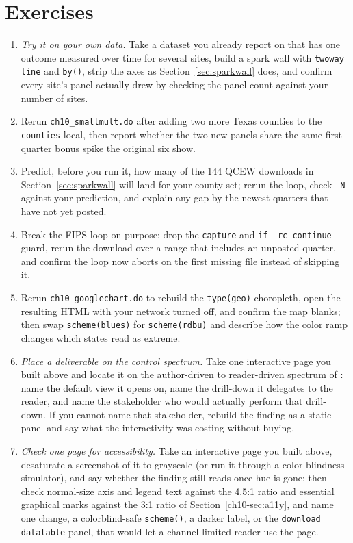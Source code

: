 \section*{Exercises}
\begin{enumerate}
\item \emph{Try it on your own data.} Take a dataset you already report on that has one outcome measured over time for several sites, build a spark wall with \texttt{twoway line} and \texttt{by()}, strip the axes as Section~\ref{sec:sparkwall} does, and confirm every site's panel actually drew by checking the panel count against your number of sites.
\item Rerun \texttt{ch10\_smallmult.do} after adding two more Texas counties to the \texttt{counties} local, then report whether the two new panels share the same first-quarter bonus spike the original six show.
\item Predict, before you run it, how many of the 144 QCEW downloads in Section~\ref{sec:sparkwall} will land for your county set; rerun the loop, check \texttt{\_N} against your prediction, and explain any gap by the newest quarters that have not yet posted.
\item Break the FIPS loop on purpose: drop the \texttt{capture} and \texttt{if \_rc continue} guard, rerun the download over a range that includes an unposted quarter, and confirm the loop now aborts on the first missing file instead of skipping it.
\item Rerun \texttt{ch10\_googlechart.do} to rebuild the \texttt{type(geo)} choropleth, open the resulting HTML with your network turned off, and confirm the map blanks; then swap \texttt{scheme(blues)} for \texttt{scheme(rdbu)} and describe how the color ramp changes which states read as extreme.
\item \emph{Place a deliverable on the control spectrum.} Take one interactive page you built above and locate it on the author-driven to reader-driven spectrum of \textcite{segel2010narrative}: name the default view it opens on, name the drill-down it delegates to the reader, and name the stakeholder who would actually perform that drill-down. If you cannot name that stakeholder, rebuild the finding as a static panel and say what the interactivity was costing without buying.
\item \emph{Check one page for accessibility.} Take an interactive page you built above, desaturate a screenshot of it to grayscale (or run it through a color-blindness simulator), and say whether the finding still reads once hue is gone; then check normal-size axis and legend text against the 4.5:1 ratio and essential graphical marks against the 3:1 ratio of Section~\ref{ch10-sec:a11y}, and name one change, a colorblind-safe \texttt{scheme()}, a darker label, or the \texttt{download datatable} panel, that would let a channel-limited reader use the page.

\end{enumerate}
